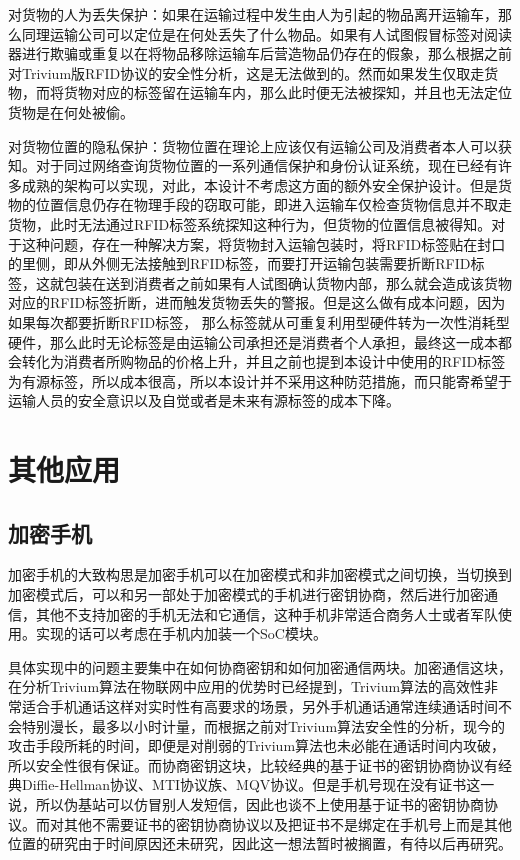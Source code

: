 对货物的人为丢失保护：如果在运输过程中发生由人为引起的物品离开运输车，那么同理运输公司可以定位是在何处丢失了什么物品。如果有人试图假冒标签对阅读器进行欺骗或重复以在将物品移除运输车后营造物品仍存在的假象，那么根据之前对Trivium版RFID协议的安全性分析，这是无法做到的。然而如果发生仅取走货物，而将货物对应的标签留在运输车内，那么此时便无法被探知，并且也无法定位货物是在何处被偷。

对货物位置的隐私保护：货物位置在理论上应该仅有运输公司及消费者本人可以获知。对于同过网络查询货物位置的一系列通信保护和身份认证系统，现在已经有许多成熟的架构可以实现，对此，本设计不考虑这方面的额外安全保护设计。但是货物的位置信息仍存在物理手段的窃取可能，即进入运输车仅检查货物信息并不取走货物，此时无法通过RFID标签系统探知这种行为，但货物的位置信息被得知。对于这种问题，存在一种解决方案，将货物封入运输包装时，将RFID标签贴在封口的里侧，即从外侧无法接触到RFID标签，而要打开运输包装需要折断RFID标签，这就包装在送到消费者之前如果有人试图确认货物内部，那么就会造成该货物对应的RFID标签折断，进而触发货物丢失的警报。但是这么做有成本问题，因为如果每次都要折断RFID标签， 那么标签就从可重复利用型硬件转为一次性消耗型硬件，那么此时无论标签是由运输公司承担还是消费者个人承担，最终这一成本都会转化为消费者所购物品的价格上升，并且之前也提到本设计中使用的RFID标签为有源标签，所以成本很高，所以本设计并不采用这种防范措施，而只能寄希望于运输人员的安全意识以及自觉或者是未来有源标签的成本下降。

\section{其他应用}

\subsection{加密手机}

加密手机的大致构思是加密手机可以在加密模式和非加密模式之间切换，当切换到加密模式后，可以和另一部处于加密模式的手机进行密钥协商，然后进行加密通信，其他不支持加密的手机无法和它通信，这种手机非常适合商务人士或者军队使用。实现的话可以考虑在手机内加装一个SoC模块。

具体实现中的问题主要集中在如何协商密钥和如何加密通信两块。加密通信这块，在分析Trivium算法在物联网中应用的优势时已经提到，Trivium算法的高效性非常适合手机通话这样对实时性有高要求的场景，另外手机通话通常连续通话时间不会特别漫长，最多以小时计量，而根据之前对Trivium算法安全性的分析，现今的攻击手段所耗的时间，即便是对削弱的Trivium算法也未必能在通话时间内攻破，所以安全性很有保证。而协商密钥这块，比较经典的基于证书的密钥协商协议有经典Diffie-Hellman协议、MTI协议族、MQV协议。但是手机号现在没有证书这一说，所以伪基站可以仿冒别人发短信，因此也谈不上使用基于证书的密钥协商协议。而对其他不需要证书的密钥协商协议以及把证书不是绑定在手机号上而是其他位置的研究由于时间原因还未研究，因此这一想法暂时被搁置，有待以后再研究。


